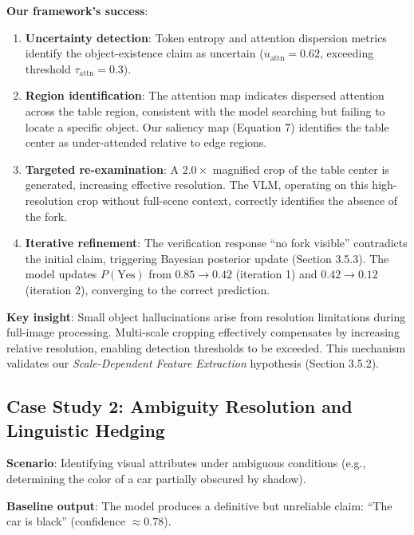 \documentclass[12pt]{article}
\begin{document}
\textbf{Our framework's success}:
\begin{enumerate}
    \item \textbf{Uncertainty detection}: Token entropy and attention dispersion 
    metrics identify the object-existence claim as uncertain ($u_{\text{attn}} = 0.62$, 
    exceeding threshold $\tau_{\text{attn}} = 0.3$).
    
    \item \textbf{Region identification}: The attention map indicates dispersed 
    attention across the table region, consistent with the model searching but 
    failing to locate a specific object. Our saliency map (Equation 7) identifies 
    the table center as under-attended relative to edge regions.
    
    \item \textbf{Targeted re-examination}: A $2.0\times$ magnified crop of the 
    table center is generated, increasing effective resolution. The VLM, operating 
    on this high-resolution crop without full-scene context, correctly identifies 
    the absence of the fork.
    
    \item \textbf{Iterative refinement}: The verification response ``no fork visible'' 
    contradicts the initial claim, triggering Bayesian posterior update (Section 3.5.3). 
    The model updates $P(\text{Yes})$ from $0.85 \to 0.42$ (iteration 1) and 
    $0.42 \to 0.12$ (iteration 2), converging to the correct prediction.
\end{enumerate}

\textbf{Key insight}: Small object hallucinations arise from resolution limitations 
during full-image processing. Multi-scale cropping effectively compensates by 
increasing relative resolution, enabling detection thresholds to be exceeded. This 
mechanism validates our \textit{Scale-Dependent Feature Extraction} hypothesis (Section 3.5.2).

\subsection{Case Study 2: Ambiguity Resolution and Linguistic Hedging}

\textbf{Scenario}: Identifying visual attributes under ambiguous conditions (e.g., 
determining the color of a car partially obscured by shadow).

\textbf{Baseline output}: The model produces a definitive but unreliable claim: 
``The car is black'' (confidence $\approx 0.78$).
\end{document}
